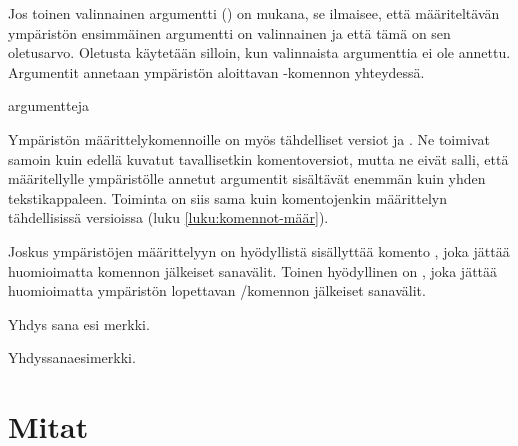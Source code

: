 Jos toinen valinnainen argumentti () on mukana, se
ilmaisee, että määriteltävän ympäristön ensimmäinen argumentti on
valinnainen ja että tämä on sen ole\-tus\-arvo. Oletusta käytetään
silloin, kun valinnaista argumenttia ei ole annettu. Argumentit annetaan
ympäristön aloittavan -ko\-men\-non yhteydessä.

\begin{koodilohkosis}
  \begin{ymp}[valinnainen]{argu}{mentteja}
  \end{ymp}
\end{koodilohkosis}

Ympäristön määrittelykomennoille on myös tähdelliset versiot
 ja . Ne
toimivat samoin kuin edellä kuvatut tavallisetkin komentoversiot, mutta
ne eivät salli, että määritellylle ympäristölle annetut argumentit
sisältävät enemmän kuin yhden tekstikappaleen. Toiminta on siis sama
kuin komentojenkin määrittelyn tähdellisissä versioissa (luku
\ref{luku:komennot-määr}).

\begin{koodilohkosis}
  \newenvironment*   {nimi}[n][oletus]{aloitus}{lopetus}
  \renewenvironment* {nimi}[n][oletus]{aloitus}{lopetus}
\end{koodilohkosis}

Joskus ympäristöjen määrittelyyn on hyödyllistä sisällyttää komento
, joka jättää huomioimatta komennon
jälkeiset sanavälit. Toinen hyödyllinen on , joka jättää huomioimatta ympäristön
lopettavan \-/komennon jälkeiset sanavälit.

\pagebreak[3]

\begin{koodilohkosis}
  \newenvironment{ymp}
    {Yhdys\ignorespaces}
    {esi\ignorespacesafterend}

  \begin{ymp}
    sana%
  \end{ymp}   merkki.
\end{koodilohkosis}

\begin{tulossis}
  Yhdyssanaesimerkki.
\end{tulossis}

\section{Mitat}
\label{luku:mitat}

